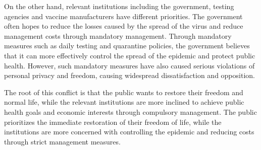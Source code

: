 \documentclass[UTF8,a4paper,AutoFakeBold,AutoFakeSlant]{article}
\begin{document}
On the other hand, relevant institutions including the government, testing agencies and vaccine manufacturers have different priorities. The government often hopes to reduce the losses caused by the spread of the virus and reduce management costs through mandatory management. Through mandatory measures such as daily testing and quarantine policies, the government believes that it can more effectively control the spread of the epidemic and protect public health. However, such mandatory measures have also caused serious violations of personal privacy and freedom, causing widespread dissatisfaction and opposition.

The root of this conflict is that the public wants to restore their freedom and normal life, while the relevant institutions are more inclined to achieve public health goals and economic interests through compulsory management. The public prioritizes the immediate restoration of their freedom of life, while the institutions are more concerned with controlling the epidemic and reducing costs through strict management measures.

\subsection{}
\end{document}

